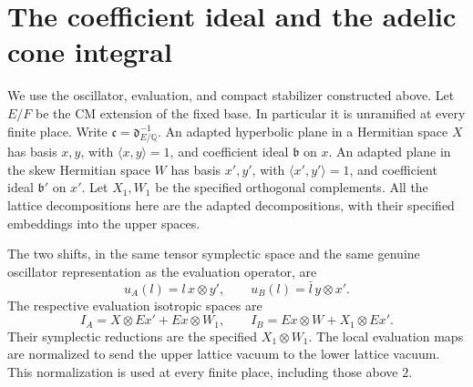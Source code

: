 

\section{The coefficient ideal and the adelic cone integral}
\label{sec:sr-cone-euler}

We use the oscillator, evaluation, and compact stabilizer constructed above.
Let \(E/F\) be the CM extension of the fixed base. In particular it is
unramified at every finite place. Write
\(\mathfrak c=\mathfrak d_{E/\mathbb Q}^{-1}\).
An adapted hyperbolic plane in a Hermitian space \(X\) has basis \(x,y\),
with \(\langle x,y\rangle=1\), and coefficient ideal \(\mathfrak b\)
on \(x\). An adapted plane in the skew Hermitian space \(W\) has basis
\(x',y'\), with \(\langle x',y'\rangle=1\), and coefficient ideal
\(\mathfrak b'\) on \(x'\). Let \(X_1,W_1\) be the specified orthogonal
complements. All the lattice decompositions here are the adapted
decompositions, with their specified embeddings into the upper spaces.

The two shifts, in the same tensor symplectic space and the same genuine
oscillator representation as the evaluation operator, are
\[
 u_A(l)=l\,x\otimes y',\qquad
 u_B(l)=\bar l\,y\otimes x'.
\]
The respective evaluation isotropic spaces are
\[
 I_A=X\otimes Ex'+Ex\otimes W_1,\qquad
 I_B=Ex\otimes W+X_1\otimes Ex'.
\]
Their symplectic reductions are the specified \(X_1\otimes W_1\).
The local evaluation maps are normalized to send the upper lattice vacuum
to the lower lattice vacuum. This normalization is used at every finite
place, including those above \(2\).

